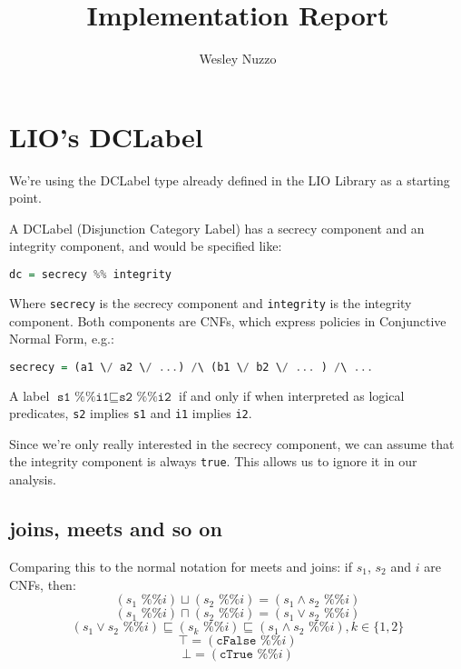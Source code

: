 \documentclass[11pt, oneside]{article}   	%
\title{Implementation Report}
\author{Wesley Nuzzo}
\begin{document}
\maketitle

\section{LIO's DCLabel}

We're using the DCLabel type already defined in the LIO Library as a starting point.

A DCLabel (Disjunction Category Label) has a secrecy component and an integrity component, and would be specified like:

\begin{lstlisting}[language=Haskell]
dc = secrecy %% integrity
\end{lstlisting}

Where \texttt{secrecy} is the secrecy component and \texttt{integrity} is the integrity component.
Both components are CNFs, which express policies in Conjunctive Normal Form, e.g.:

\begin{lstlisting}[language=Haskell]
secrecy = (a1 \/ a2 \/ ...) /\ (b1 \/ b2 \/ ... ) /\ ...
\end{lstlisting}

A label $\texttt{s1 \%\% i1} \sqsubseteq \texttt{s2 \%\% i2}$ if and only if when interpreted as logical predicates, \texttt{s2} implies  \texttt{s1} and  \texttt{i1} implies \texttt{i2}.

Since we're only really interested in the secrecy component, we can assume that the integrity component is always \texttt{true}. This allows us to ignore it in our analysis.

\subsection{joins, meets and so on}

Comparing this to the normal notation for meets and joins: if $s_1$, $s_2$ and $i$ are CNFs, then:
$$(s_1\texttt{ \%\% }i) \sqcup (s_2\texttt{ \%\% }i) = (s_1\land s_2 \texttt{ \%\% } i)$$
$$(s_1\texttt{ \%\% }i) \sqcap (s_2\texttt{ \%\% }i) = (s_1\lor s_2 \texttt{ \%\% } i)$$
$$(s_1\lor s_2 \texttt{ \%\% } i) \sqsubseteq (s_k\texttt{ \%\% } i)  \sqsubseteq (s_1\land s_2 \texttt{ \%\% } i), k\in\{1,2\}$$
$$\top = (\texttt{cFalse} \texttt{ \%\% }i)$$
$$\bot = (\texttt{cTrue} \texttt{ \%\% }i)$$
\end{document}
